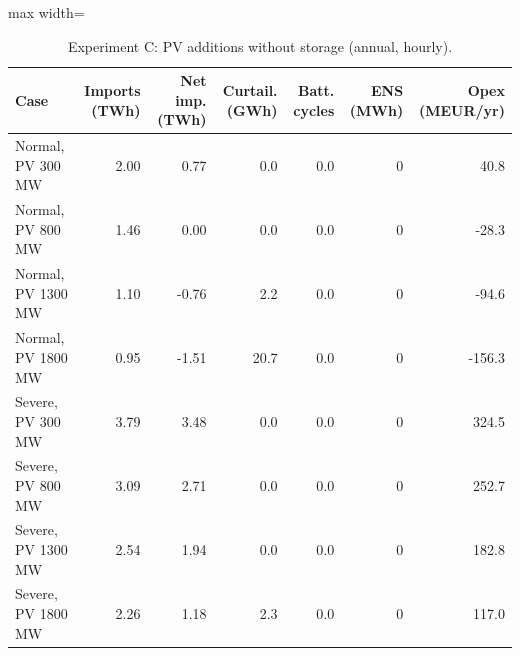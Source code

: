 \begin{table}[htbp]
\centering
\footnotesize
\caption{Experiment C: PV additions without storage (annual, hourly).}
\label{tab:exp-C}
\begin{adjustbox}{max width=\linewidth}
\begin{tabular}{lrrrrrr}
\toprule
Case & Imports (TWh) & Net imp. (TWh) & Curtail. (GWh) & Batt. cycles & ENS (MWh) & Opex (MEUR/yr) \\
\midrule
Normal, PV 300 MW & 2.00 & 0.77 & 0.0 & 0.0 & 0 & 40.8 \\
Normal, PV 800 MW & 1.46 & 0.00 & 0.0 & 0.0 & 0 & -28.3 \\
Normal, PV 1300 MW & 1.10 & -0.76 & 2.2 & 0.0 & 0 & -94.6 \\
Normal, PV 1800 MW & 0.95 & -1.51 & 20.7 & 0.0 & 0 & -156.3 \\
Severe, PV 300 MW & 3.79 & 3.48 & 0.0 & 0.0 & 0 & 324.5 \\
Severe, PV 800 MW & 3.09 & 2.71 & 0.0 & 0.0 & 0 & 252.7 \\
Severe, PV 1300 MW & 2.54 & 1.94 & 0.0 & 0.0 & 0 & 182.8 \\
Severe, PV 1800 MW & 2.26 & 1.18 & 2.3 & 0.0 & 0 & 117.0 \\
\bottomrule
\end{tabular}
\end{adjustbox}
\end{table}
